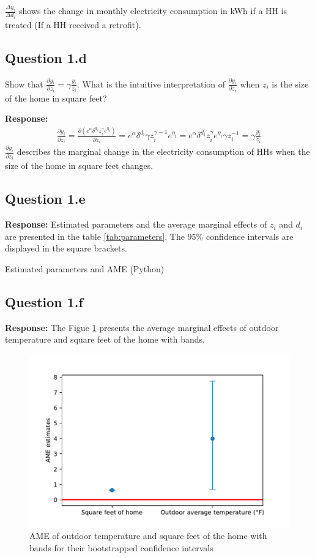 \documentclass{article}
\begin{document}
\(\frac{\Delta y_i}{\Delta d_i}\) shows the change in monthly electricity consumption in kWh if a HH is treated (If a HH received a retrofit).
 
\subsection*{Question 1.d} Show that \(\frac{\partial y_i}{\partial z_i} = \gamma \frac{y_i}{z_i}\). What is the intuitive interpretation of \(\frac{\partial y_i}{\partial z_i}\) when \(z_i\) is the size of the home in square feet?

\textbf{Response:}
\begin{align}
    \frac{\partial y_i}{\partial z_i} = \frac{\partial (e^{\alpha} \delta^{d_i} z_i^\gamma e^{\eta_i})}{\partial z_i} = 
                                       e^{\alpha} \delta^{d_i} \gamma z_i^{\gamma - 1} e^{\eta_i} = 
                                      e^{\alpha} \delta^{d_i} z_i^\gamma e^{\eta_i} \gamma z_i^{- 1} = 
                                      \gamma \frac{y_i}{z_i}
                                      \end{align}
\(\frac{\partial y_i}{\partial z_i}\) describes the marginal change in the electricity consumption of HHs when the size of the home in square feet changes. 

\subsection*{Question 1.e}
\textbf{Response:} 
Estimated parameters and the average marginal effects of \(z_i\) and \(d_i\) are presented in the table \ref{tab:parameters}. The 95\% confidence intervals are displayed in the square brackets. 

\begin{table}[hbt!]
    \centering
    
    \caption{Estimated parameters and AME (Python)}
    \label{tab:parameters}
        \end{table}

\FloatBarrier
\subsection*{Question 1.f}
\textbf{Response:} 
The Figue \ref{fig:CI} presents the average marginal effects of outdoor temperature and square feet of the home with
bands.

\begin{figure}[hbt!]
    \centering
    \includegraphics[scale = 0.7]{homework 3/output/figure/hw3ame.pdf}
    \caption{AME of outdoor temperature and square feet of the home with bands for their bootstrapped confidence intervals}
    \label{fig:CI}
\end{figure}
\end{document}
